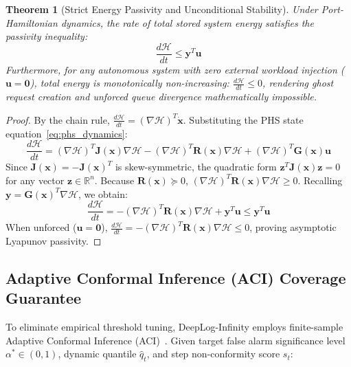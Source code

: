 \documentclass[letterpaper,twocolumn,10pt]{article}
\newtheorem{theorem}{Theorem}
\begin{document}
\begin{theorem}[Strict Energy Passivity and Unconditional Stability]
\label{thm:port_hamiltonian_passivity}
Under Port-Hamiltonian dynamics, the rate of total stored system energy satisfies the passivity inequality:
\begin{equation}
\frac{d\mathcal{H}}{dt} \le \mathbf{y}^T \mathbf{u}
\end{equation}
Furthermore, for any autonomous system with zero external workload injection ($\mathbf{u} = \mathbf{0}$), total energy is monotonically non-increasing: $\frac{d\mathcal{H}}{dt} \le 0$, rendering ghost request creation and unforced queue divergence mathematically impossible.
\end{theorem}

\begin{proof}
By the chain rule, $\frac{d\mathcal{H}}{dt} = (\nabla \mathcal{H})^T \dot{\mathbf{x}}$. Substituting the PHS state equation~\eqref{eq:phs_dynamics}:
\begin{equation}
\frac{d\mathcal{H}}{dt} = (\nabla \mathcal{H})^T \mathbf{J}(\mathbf{x}) \nabla \mathcal{H} - (\nabla \mathcal{H})^T \mathbf{R}(\mathbf{x}) \nabla \mathcal{H} + (\nabla \mathcal{H})^T \mathbf{G}(\mathbf{x})\mathbf{u}
\end{equation}
Since $\mathbf{J}(\mathbf{x}) = -\mathbf{J}(\mathbf{x})^T$ is skew-symmetric, the quadratic form $\mathbf{z}^T \mathbf{J}(\mathbf{x}) \mathbf{z} = 0$ for any vector $\mathbf{z} \in \mathbb{R}^n$. Because $\mathbf{R}(\mathbf{x}) \succeq 0$, $(\nabla \mathcal{H})^T \mathbf{R}(\mathbf{x}) \nabla \mathcal{H} \ge 0$. Recalling $\mathbf{y} = \mathbf{G}(\mathbf{x})^T \nabla \mathcal{H}$, we obtain:
\begin{equation}
\frac{d\mathcal{H}}{dt} = -(\nabla \mathcal{H})^T \mathbf{R}(\mathbf{x}) \nabla \mathcal{H} + \mathbf{y}^T \mathbf{u} \le \mathbf{y}^T \mathbf{u}
\end{equation}
When unforced ($\mathbf{u} = \mathbf{0}$), $\frac{d\mathcal{H}}{dt} = -(\nabla \mathcal{H})^T \mathbf{R}(\mathbf{x}) \nabla \mathcal{H} \le 0$, proving asymptotic Lyapunov passivity.
\end{proof}

\subsection{Adaptive Conformal Inference (ACI) Coverage Guarantee}
\label{sec:math_conformal}
To eliminate empirical threshold tuning, DeepLog-Infinity employs finite-sample Adaptive Conformal Inference (ACI)~\cite{gibbs2021adaptive}. Given target false alarm significance level $\alpha^* \in (0, 1)$, dynamic quantile $\hat{q}_t$, and step non-conformity score $s_t$:
\end{document}

